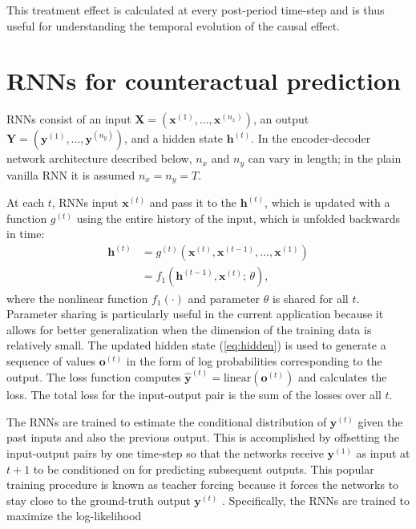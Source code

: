 \documentclass[hidelinks,12pt]{article}
\begin{document}
This treatment effect is calculated at every post-period time-step and is thus useful for understanding the temporal evolution of the causal effect.

\section{RNNs for counteractual prediction} \label{RNNs-section}

RNNs \citep{graves2012,goodfellow2016deep} consist of an input $\boldsymbol{X} = \left(\boldsymbol{x}^{(1)}, \ldots, \boldsymbol{x}^{(n_x)}\right)$, an output $\boldsymbol{Y} = \left(\boldsymbol{y}^{(1)}, \ldots, \boldsymbol{y}^{(n_y)}\right)$, and a hidden state $\boldsymbol{h}^{(t)}$. In the encoder-decoder network architecture described below, $n_x$ and $n_y$ can vary in length; in the plain vanilla RNN it is assumed $n_x = n_y = T$.  

At each $t$, RNNs input $\boldsymbol{x}^{(t)}$ and pass it to the $\boldsymbol{h}^{(t)}$, which is updated with a function $g^{(t)}$ using the entire history of the input, which is unfolded backwards in time:
%
\begin{align}
\boldsymbol{h}^{(t)} &= g^{(t)} \left(\boldsymbol{x}^{(t)}, \boldsymbol{x}^{(t-1)}, \ldots, \boldsymbol{x}^{(1)} \right) \nonumber \\ 
&= f_1 \left( \boldsymbol{h}^{(t-1)}, \boldsymbol{x}^{(t)}; \, \theta \right), \label{eq:hidden}
\end{align} where the nonlinear function $f_1(\cdot)$ and parameter $\theta$ is shared for all $t$. Parameter sharing is particularly useful in the current application because it allows for better generalization when the dimension of the training data is relatively small. The updated hidden state (\ref{eq:hidden}) is used to generate a sequence of values $\boldsymbol{o}^{(t)}$ in the form of log probabilities corresponding to the output. The loss function computes $\boldsymbol{\hat{y}}^{(t)} = \mathrm{linear} (\boldsymbol{o}^{(t)})$ and calculates the loss. The total loss for the input-output pair is the sum of the losses over all $t$.

The RNNs are trained to estimate the conditional distribution of $\boldsymbol{y}^{(t)}$ given the past inputs and also the previous output. This is accomplished by offsetting the input-output pairs by one time-step so that the networks receive $\boldsymbol{y}^{(1)}$  as input at $t + 1$ to be conditioned on for predicting subsequent outputs. This popular training procedure is known as teacher forcing because it forces the networks to stay close to the ground-truth output $\boldsymbol{y}^{(t)}$ \citep{lamb2016professor}. Specifically, the RNNs are trained to maximize the log-likelihood
\end{document}

